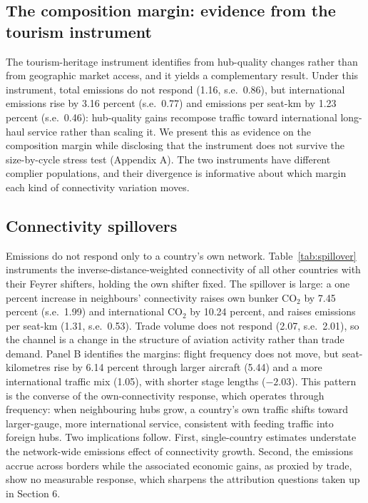 \documentclass[12pt]{article}
\begin{document}
\subsection{The composition margin: evidence from the tourism instrument}
The tourism-heritage instrument identifies from hub-quality changes rather
than from geographic market access, and it yields a complementary result.
Under this instrument, total emissions do not respond (1.16, s.e.\ 0.86),
but international emissions rise by 3.16 percent (s.e.\ 0.77) and emissions
per seat-km by 1.23 percent (s.e.\ 0.46): hub-quality gains recompose
traffic toward international long-haul service rather than scaling it. We
present this as evidence on the composition margin while disclosing that
the instrument does not survive the size-by-cycle stress test (Appendix A).
The two instruments have different complier populations, and their
divergence is informative about which margin each kind of connectivity
variation moves.

\subsection{Connectivity spillovers}
Emissions do not respond only to a country's own network.
Table~\ref{tab:spillover} instruments the inverse-distance-weighted
connectivity of all other countries with their Feyrer shifters, holding the
own shifter fixed. The spillover is large: a one percent increase in
neighbours' connectivity raises own bunker CO$_2$ by 7.45 percent (s.e.\
1.99) and international CO$_2$ by 10.24 percent, and raises emissions per
seat-km (1.31, s.e.\ 0.53). Trade volume does not respond (2.07, s.e.\
2.01), so the channel is a change in the structure of aviation activity
rather than trade demand. Panel B identifies the margins: flight frequency
does not move, but seat-kilometres rise by 6.14 percent through larger
aircraft (5.44) and a more international traffic mix (1.05), with shorter
stage lengths ($-2.03$). This pattern is the converse of the own-connectivity
response, which operates through frequency: when neighbouring hubs grow, a
country's own traffic shifts toward larger-gauge, more international
service, consistent with feeding traffic into foreign hubs. Two
implications follow. First, single-country estimates understate the
network-wide emissions effect of connectivity growth. Second, the emissions
accrue across borders while the associated economic gains, as proxied by
trade, show no measurable response, which sharpens the attribution
questions taken up in Section 6.
\end{document}
